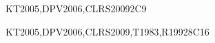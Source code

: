 \begin{syllabus}
    \begin{unit}{\ALBasicAutomataComputabilityandComplexity}{}{KT2005,DPV2006,CLRS2009}{2}{C9}
    \begin{topics}%
        \item \ALBasicAutomataComputabilityandComplexityTopicIntroduction %
        \item \ALBasicAutomataComputabilityandComplexityTopicIntroductionTo %
    \end{topics}
    \begin{learningoutcomes}
        \item \ALBasicAutomataComputabilityandComplexityLODefine [\Familiarity] %
        \item \ALBasicAutomataComputabilityandComplexityLOExplainTheNp [\Familiarity] %
    \end{learningoutcomes}
    \end{unit}
    
    \begin{unit}{\ALAdvancedDataStructuresAlgorithmsandAnalysis}{}{KT2005,DPV2006,CLRS2009,T1983,R1992}{8}{C16}
    \begin{topics}%
        \item \ALAdvancedDataStructuresAlgorithmsandAnalysisTopicGraphs %
        \item \ALAdvancedDataStructuresAlgorithmsandAnalysisTopicNumber %
        \item \ALAdvancedDataStructuresAlgorithmsandAnalysisTopicRandomized %
        \item \ALAdvancedDataStructuresAlgorithmsandAnalysisTopicAmortized %
        \item \ALAdvancedDataStructuresAlgorithmsandAnalysisTopicProbabilistic %
    \end{topics}
    \begin{learningoutcomes}
        \item \ALAdvancedDataStructuresAlgorithmsandAnalysisLOUnderstand [\Familiarity]%
        \item \ALAdvancedDataStructuresAlgorithmsandAnalysisLOSelect [\Usage] %
        \item \ALAdvancedDataStructuresAlgorithmsandAnalysisLOSelectAnd [\Usage] %
    \end{learningoutcomes}
    \end{unit}
    

\end{syllabus}
